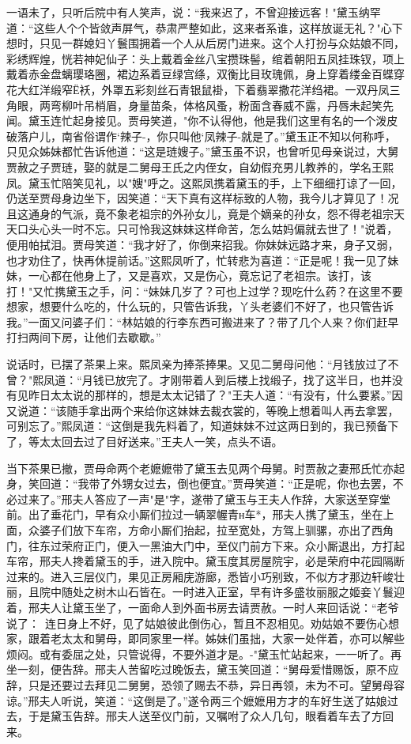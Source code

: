一语未了，只听后院中有人笑声，说：“我来迟了，不曾迎接远客！"黛玉纳罕道：“这些人个个皆敛声屏气，恭肃严整如此，这来者系谁，这样放诞无礼？"心下想时，只见一群媳妇丫鬟围拥着一个人从后房门进来。这个人打扮与众姑娘不同，彩绣辉煌，恍若神妃仙子：头上戴着金丝八宝攒珠髻，绾着朝阳五凤挂珠钗，项上戴着赤金盘螭璎珞圈，裙边系着豆绿宫绦，双衡比目玫瑰佩，身上穿着缕金百蝶穿花大红洋缎窄Ё袄，外罩五彩刻丝石青银鼠褂，下着翡翠撒花洋绉裙。一双丹凤三角眼，两弯柳叶吊梢眉，身量苗条，体格风蚤，粉面含春威不露，丹唇未起笑先闻。黛玉连忙起身接见。贾母笑道，"你不认得他，他是我们这里有名的一个泼皮破落户儿，南省俗谓作`辣子-，你只叫他`凤辣子-就是了。”黛玉正不知以何称呼，只见众姊妹都忙告诉他道：“这是琏嫂子。”黛玉虽不识，也曾听见母亲说过，大舅贾赦之子贾琏，娶的就是二舅母王氏之内侄女，自幼假充男儿教养的，学名王熙凤。黛玉忙陪笑见礼，以"嫂"呼之。这熙凤携着黛玉的手，上下细细打谅了一回，仍送至贾母身边坐下，因笑道：“天下真有这样标致的人物，我今儿才算见了！况且这通身的气派，竟不象老祖宗的外孙女儿，竟是个嫡亲的孙女，怨不得老祖宗天天口头心头一时不忘。只可怜我这妹妹这样命苦，怎么姑妈偏就去世了！"说着，便用帕拭泪。贾母笑道：“我才好了，你倒来招我。你妹妹远路才来，身子又弱，也才劝住了，快再休提前话。”这熙凤听了，忙转悲为喜道：“正是呢！我一见了妹妹，一心都在他身上了，又是喜欢，又是伤心，竟忘记了老祖宗。该打，该打！"又忙携黛玉之手，问：“妹妹几岁了？可也上过学？现吃什么药？在这里不要想家，想要什么吃的，什么玩的，只管告诉我，丫头老婆们不好了，也只管告诉我。”一面又问婆子们：“林姑娘的行李东西可搬进来了？带了几个人来？你们赶早打扫两间下房，让他们去歇歇。”

说话时，已摆了茶果上来。熙凤亲为捧茶捧果。又见二舅母问他：“月钱放过了不曾？"熙凤道：“月钱已放完了。才刚带着人到后楼上找缎子，找了这半日，也并没有见昨日太太说的那样的，想是太太记错了？"王夫人道：“有没有，什么要紧。”因又说道：“该随手拿出两个来给你这妹妹去裁衣裳的，等晚上想着叫人再去拿罢，可别忘了。”熙凤道：“这倒是我先料着了，知道妹妹不过这两日到的，我已预备下了，等太太回去过了目好送来。”王夫人一笑，点头不语。

当下茶果已撤，贾母命两个老嬷嬷带了黛玉去见两个母舅。时贾赦之妻邢氏忙亦起身，笑回道：“我带了外甥女过去，倒也便宜。”贾母笑道：“正是呢，你也去罢，不必过来了。”邢夫人答应了一声"是"字，遂带了黛玉与王夫人作辞，大家送至穿堂前。出了垂花门，早有众小厮们拉过一辆翠幄青н车*，邢夫人携了黛玉，坐在上面，众婆子们放下车帘，方命小厮们抬起，拉至宽处，方驾上驯骡，亦出了西角门，往东过荣府正门，便入一黑油大门中，至仪门前方下来。众小厮退出，方打起车帘，邢夫人搀着黛玉的手，进入院中。黛玉度其房屋院宇，必是荣府中花园隔断过来的。进入三层仪门，果见正房厢庑游廊，悉皆小巧别致，不似方才那边轩峻壮丽，且院中随处之树木山石皆在。一时进入正室，早有许多盛妆丽服之姬妾丫鬟迎着，邢夫人让黛玉坐了，一面命人到外面书房去请贾赦。一时人来回话说：“老爷说了：~连日身上不好，见了姑娘彼此倒伤心，暂且不忍相见。劝姑娘不要伤心想家，跟着老太太和舅母，即同家里一样。姊妹们虽拙，大家一处伴着，亦可以解些烦闷。或有委屈之处，只管说得，不要外道才是。-"黛玉忙站起来，一一听了。再坐一刻，便告辞。邢夫人苦留吃过晚饭去，黛玉笑回道：“舅母爱惜赐饭，原不应辞，只是还要过去拜见二舅舅，恐领了赐去不恭，异日再领，未为不可。望舅母容谅。”邢夫人听说，笑道：“这倒是了。”遂令两三个嬷嬷用方才的车好生送了姑娘过去，于是黛玉告辞。邢夫人送至仪门前，又嘱咐了众人几句，眼看着车去了方回来。

